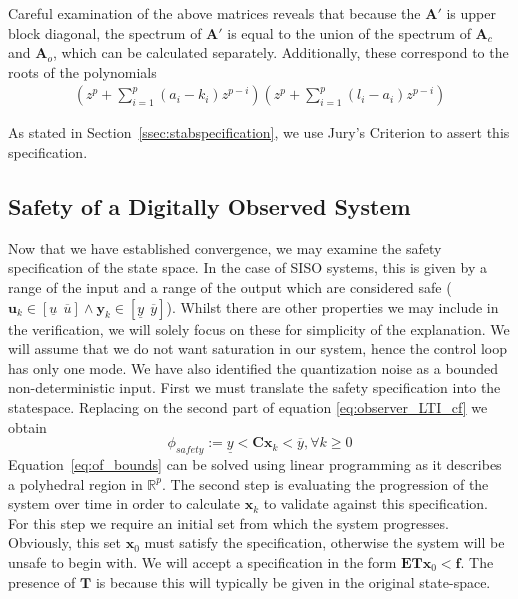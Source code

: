 \documentclass[sigconf]{llncs}
\newcommand{\mat}[1]{\boldsymbol{#1}}
\renewcommand{\vec}[1]{\boldsymbol{#1}}
\begin{document}
Careful examination of the above matrices reveals that because the $\mat{A}'$ is
upper block diagonal, the spectrum of $\mat{A}'$ is equal to the union of
the spectrum of $\mat{A}_{c}$ and $\mat{A}_{o}$, which can be calculated
separately.  Additionally, these correspond to the roots of the polynomials
%
\begin{align*}
\left(z^p+\sum_{i=1}^p{(a_i-k_i)z^{p-i}}\right) \left(z^p+\sum_{i=1}^p{(l_i-a_i)z^{p-i}}\right)
\end{align*}

As stated in Section~\ref{ssec:stabspecification}, we use Jury's Criterion
to assert this specification.

\subsection{Safety of a Digitally Observed System}\label{sec:cof_safety}

Now that we have established convergence, we may examine the safety
specification of the state space.  In the case of SISO systems, this is
given by a range of the input and a range of the output which are considered
safe ($\vec{u}_k \in [\underline{u}\ \ \overline{u}] \wedge \vec{y}_k \in
[\underline{y}\ \ \overline{y}]$).  Whilst there are other properties we may
include in the verification, we will solely focus on these for simplicity of
the explanation.  We will assume that we do not want saturation in our
system, hence the control loop has only one mode.  We have also identified
the quantization noise as a bounded non-deterministic input.  First we must
translate the safety specification into the statespace.  Replacing on the
second part of equation \eqref{eq:observer_LTI_cf} we obtain
%
\begin{equation}
\phi_{safety} := \underline{y}<\mat{C}\vec{x}_k<\overline{y}, \forall k \geq 0
\label{eq:of_bounds}
\end{equation}
%
%
Equation~\eqref{eq:of_bounds} can be solved using linear programming as it
describes a polyhedral region in $\mathbb{R}^p$.  The second step is
evaluating the progression of the system over time in order to calculate
$\vec{x}_k$ to validate against this specification.  For this step we require
an initial set from which the system progresses.  Obviously, this set
$\vec{x}_0$ must satisfy the specification, otherwise the system will be
unsafe to begin with.  We will accept a specification in the form
$\mat{E}\mat{T}\vec{x}_0<\mat{f}$.  The presence of $\mat{T}$ is because
this will typically be given in the original state-space.
\end{document}
